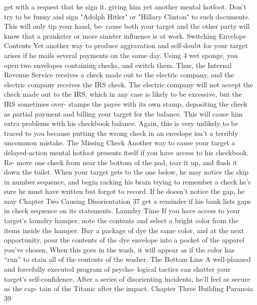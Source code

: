 \documentclass{book}
\begin{document}
get with a request that he sign it, giving him yet another 
mental hotfoot. 
Don't try to be funny and sign "Adolph Hitler" or "Hillary 
Clinton" to such documents. This will only tip your hand, be- 
cause both your target and the other party will know that a 
prankster or more sinister influence is at work. 
Switching Envelope Contents 
Yet another way to produce aggravation and self-doubt for 
your target arises if he mails several payments on the same day. 
Using 4 wet sponge, you open two envelopes containing 
checks, and switch them. Thus, the Internal Revenue Service 
receives a check made out to the electric company, and the 
electric company receives the IRS check. The electric company 
will not accept the check made out to the IRS, which in any 
case is likely to be excessive, but the IRS sometimes over- 
stamps the payee with its own stamp, depositing the check as 
partial payment and billing your target for the balance. This will 
cause him extra problems with his checkbook balance. Again, 
this is very unlikely to be traced to you because putting the 
wrong check in an envelope isn't a terribly uncommon mistake. 
The Missing Check 
Another way to cause your target a delayed-action mental 
hotfoot presents itself if you have access to his checkbook. Re- 
move one check from near the bottom of the pad, tear it up, and 
flush it down the toilet. When your target gets to the one below, 
he may notice the skip in number sequence, and begin racking 
his brain trying to remember a check he’s sure he must have 
written but forgot to record. If he doesn't notice the gap, he may 
Chapter Two 
Causing Disorientation 
37 
get a reminder if his bank lists gaps in check sequence on its 
statements. 
Laundry Time 
If you have access to your target's laundry hamper, note the 
contents and select a bright color from the items inside the 
hamper. Buy a package of dye the same color, and at the next 
opportunity, pour the contents of the dye envelope into a pocket 
of the apparel you've chosen, When this goes in the wash, it 
will appear as if the color has “run” to stain all of the contents 
of the washer. 
The Bottom Line 
A well-planned and forcefully executed program of psycho- 
logical tactics can shatter your target's self-confidence, After a 
series of disorienting incidents, he'll feel as secure as the cap- 
tain of the Titanic after the impact.    Chapter Three 
Building Paranoia 
39 
\end{document}
